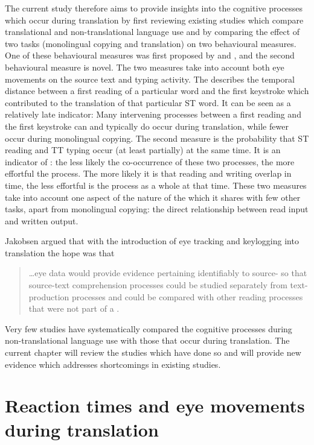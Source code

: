 \documentclass[output=paper]{LSP/langsci}
\begin{document}
The current study therefore aims to provide insights into the cognitive processes which occur during translation by first reviewing existing studies which compare translational and non-translational language use and by comparing the effect of two tasks (monolingual copying and translation) on two behavioural measures. One of these behavioural measures was first proposed by \citet{Dragsted2008} and \citet{Dragsted2010}, and the second behavioural measure is novel. The two measures take into account both eye movements on the source text and typing activity. The  \citep{Dragsted2008,Dragsted2010} describes the temporal distance between a first reading of a particular word and the first keystroke which contributed to the translation of that particular ST word. It can be seen as a relatively late indicator: Many intervening processes between a first reading and the first keystroke can and typically do occur during translation, while fewer occur during monolingual copying. The second measure is the probability that ST reading and TT typing occur (at least partially) at the same time. It is an indicator of : the less likely the co-occurrence of these two processes, the more effortful the process. The more likely it is that reading and writing overlap in time, the less effortful is the process as a whole at that time. These two measures take into account one aspect of the nature of the  which it shares with few other tasks, apart from monolingual copying: the direct relationship between read input and written output.

\largerpage
Jakobsen argued that with the introduction of eye tracking and keylogging into translation  the hope was that
\begin{quote}
\ldots eye data would provide evidence pertaining identifiably to source- so that source-text comprehension processes could be studied separately from text-production processes and could be compared with other reading processes that were not part of a . \citep[41]{Hild2011}
\end{quote}
Very few studies have systematically compared the cognitive processes during non-translational language use with those that occur during translation. The current chapter will review the studies which have done so and will provide new evidence which addresses shortcomings in existing studies.

\section{Reaction times and eye movements during translation}
\end{document}
